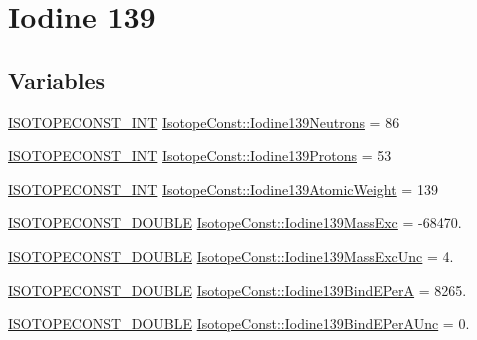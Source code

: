 \hypertarget{group___isotope_const-_iodine-_i139}{}\section{Iodine 139}
\label{group___isotope_const-_iodine-_i139}
\subsection*{Variables}
\begin{DoxyCompactItemize}
\item 
\mbox{\hyperlink{group___isotope_const-_macros_ga5f18360b3e99483a35c32d789e62621c}{I\+S\+O\+T\+O\+P\+E\+C\+O\+N\+S\+T\+\_\+\+I\+NT}} \mbox{\hyperlink{group___isotope_const-_iodine-_i139_gab1410a2d73c14a9aeecf7dd8acf49a54}{Isotope\+Const\+::\+Iodine139\+Neutrons}} = 86
\item 
\mbox{\hyperlink{group___isotope_const-_macros_ga5f18360b3e99483a35c32d789e62621c}{I\+S\+O\+T\+O\+P\+E\+C\+O\+N\+S\+T\+\_\+\+I\+NT}} \mbox{\hyperlink{group___isotope_const-_iodine-_i139_ga14828ad9761bfbaa4c067b53f44668b9}{Isotope\+Const\+::\+Iodine139\+Protons}} = 53
\item 
\mbox{\hyperlink{group___isotope_const-_macros_ga5f18360b3e99483a35c32d789e62621c}{I\+S\+O\+T\+O\+P\+E\+C\+O\+N\+S\+T\+\_\+\+I\+NT}} \mbox{\hyperlink{group___isotope_const-_iodine-_i139_ga8aaa851f9af62b34d1080c1690e44b08}{Isotope\+Const\+::\+Iodine139\+Atomic\+Weight}} = 139
\item 
\mbox{\hyperlink{group___isotope_const-_macros_ga8f45a7272ce02c0b4c65c44636ed719a}{I\+S\+O\+T\+O\+P\+E\+C\+O\+N\+S\+T\+\_\+\+D\+O\+U\+B\+LE}} \mbox{\hyperlink{group___isotope_const-_iodine-_i139_gac013ee1a173a369dfde4f2d3e5642388}{Isotope\+Const\+::\+Iodine139\+Mass\+Exc}} = -\/68470.
\item 
\mbox{\hyperlink{group___isotope_const-_macros_ga8f45a7272ce02c0b4c65c44636ed719a}{I\+S\+O\+T\+O\+P\+E\+C\+O\+N\+S\+T\+\_\+\+D\+O\+U\+B\+LE}} \mbox{\hyperlink{group___isotope_const-_iodine-_i139_ga162ddfd76f4049818a2c571a3b58d6fa}{Isotope\+Const\+::\+Iodine139\+Mass\+Exc\+Unc}} = 4.
\item 
\mbox{\hyperlink{group___isotope_const-_macros_ga8f45a7272ce02c0b4c65c44636ed719a}{I\+S\+O\+T\+O\+P\+E\+C\+O\+N\+S\+T\+\_\+\+D\+O\+U\+B\+LE}} \mbox{\hyperlink{group___isotope_const-_iodine-_i139_gaf4a6e9deb2e840b4d2ecbc7c0bfa1bb7}{Isotope\+Const\+::\+Iodine139\+Bind\+E\+PerA}} = 8265.
\item 
\mbox{\hyperlink{group___isotope_const-_macros_ga8f45a7272ce02c0b4c65c44636ed719a}{I\+S\+O\+T\+O\+P\+E\+C\+O\+N\+S\+T\+\_\+\+D\+O\+U\+B\+LE}} \mbox{\hyperlink{group___isotope_const-_iodine-_i139_ga7ed08d4eef104c9a90e21975607629dd}{Isotope\+Const\+::\+Iodine139\+Bind\+E\+Per\+A\+Unc}} = 0.

\end{DoxyCompactItemize}
